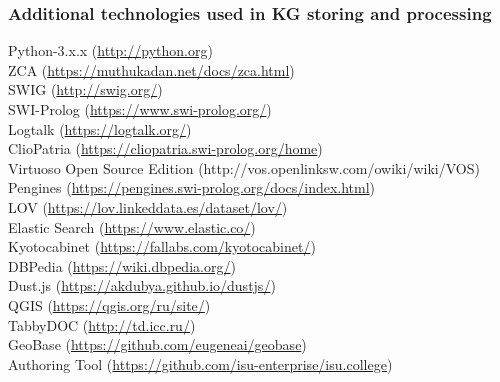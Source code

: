 \documentclass[10pt]{beamer}
\begin{document}
\begin{frame}
  \frametitle{Additional technologies used in KG storing and processing}
  Python-3.x.x (\url{http://python.org})\\
  ZCA (\url{https://muthukadan.net/docs/zca.html})\\
  SWIG (\url{http://swig.org/})\\
  SWI-Prolog (\url{https://www.swi-prolog.org/})\\
  Logtalk (\url{https://logtalk.org/})\\
  ClioPatria (\url{https://cliopatria.swi-prolog.org/home})\\
  Virtuoso Open Source Edition (http://vos.openlinksw.com/owiki/wiki/VOS)\\
  Pengines (\url{https://pengines.swi-prolog.org/docs/index.html})\\
  LOV (\url{https://lov.linkeddata.es/dataset/lov/})\\
  Elastic Search (\url{https://www.elastic.co/})\\
  Kyotocabinet (\url{https://fallabs.com/kyotocabinet/})\\
  DBPedia (\url{https://wiki.dbpedia.org/})\\
  Dust.js (\url{https://akdubya.github.io/dustjs/})\\
  QGIS (\url{https://qgis.org/ru/site/})\\
  TabbyDOC (\url{http://td.icc.ru/})\\
  GeoBase (\url{https://github.com/eugeneai/geobase})\\
  Authoring Tool (\url{https://github.com/isu-enterprise/isu.college})
\end{frame}
\end{document}
